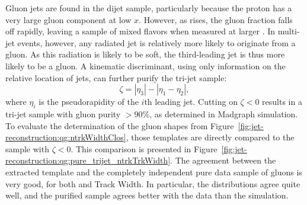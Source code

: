 Gluon jets are found in the dijet sample, particularly because the proton has a very large gluon component at low $x$. However, as \pt rises, the gluon fraction falls off rapidly, leaving a sample of mixed flavors when measured at larger \pt. In multi-jet events, however, any radiated jet is relatively more likely to originate from a gluon. As this radiation is likely to be soft, the third-leading jet is thus more likely to be a gluon. A kinematic discriminant, using only information on the relative location of jets, can further purify the tri-jet sample: 
%
\begin{equation}
\zeta=|\eta_3|-|\eta_1-\eta_2|,
\end{equation}
%
where $\eta_i$ is the pseudorapidity of the $i$th leading jet. Cutting on $\zeta < 0$ results in a tri-jet sample with gluon purity $> 90\%$, as determined in {\sc Madgraph} simulation. To evaluate the determination of the gluon shapes from Figure~\ref{fig:jet-reconstruction:qg:ntrkWidthClos}, those templates are directly compared to the sample with $\zeta < 0$. This comparison is presented in Figure~\ref{fig:jet-reconstruction:qg:pure_trijet_ntrkTrkWidth}. The agreement between the extracted template and the completely independent pure data sample of gluons is very good, for both \ntrk and Track Width. In particular, the \ntrk distributions agree quite well, and the purified sample agrees better with the data than the \Pythia simulation.

